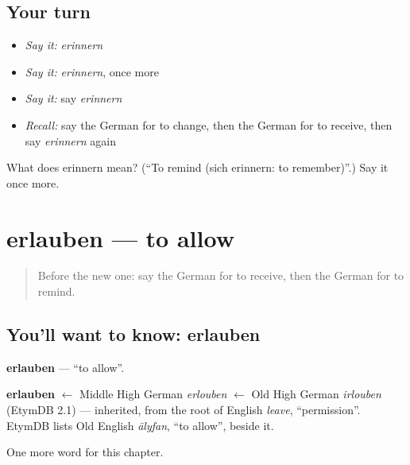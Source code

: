 \subsection*{Your turn}
\begin{itemize}
\raggedright
  \item \emph{Say it:} \emph{erinnern}
  \item \emph{Say it:} \emph{erinnern}, once more
  \item \emph{Say it:} say \emph{erinnern}
  \item \emph{Recall:} say the German for to change, then the German for to receive, then say \emph{erinnern} again
\end{itemize}

\begin{tcolorbox}[breakable,colback=teal!4,colframe=teal!35!black,title={Before you move on}]
What does erinnern mean? (\textquotedblleft{}To remind (sich erinnern: to remember)\textquotedblright{}.) Say it once more.
\end{tcolorbox}
\section[erlauben]{erlauben — to allow}

\label{lesson:GE-C179-erlauben}



\begin{quote}
Before the new one: say the German for to receive, then the German for to remind.
\end{quote}

\subsection*{You'll want to know: erlauben}
\textbf{erlauben} — \textquotedblleft{}to allow\textquotedblright{}.

\begin{cousinweb}
\textbf{erlauben} $\leftarrow$ Middle High German \emph{erlouben} $\leftarrow$ Old High German \emph{irlouben} (EtymDB 2.1) — inherited, from the root of English \emph{leave}, \textquotedblleft{}permission\textquotedblright{}. EtymDB lists Old English \emph{ālyfan}, \textquotedblleft{}to allow\textquotedblright{}, beside it.
\end{cousinweb}

\begin{grammarlens}[title={What you've built}]
One more word for this chapter.
\end{grammarlens}

